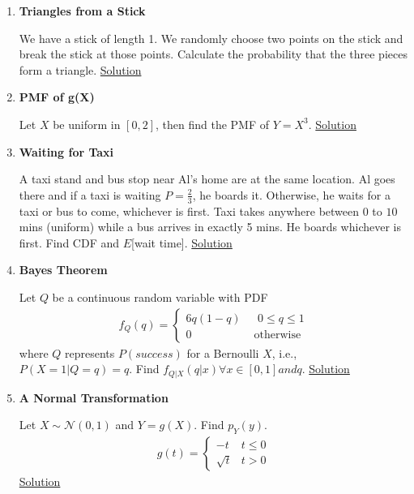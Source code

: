 \documentclass[../probability-notes.tex]{subfiles}
\begin{document}
\begin{enumerate}
    \item \hypertarget{q_trianglestick}{\textbf{Triangles from a Stick}}\newline
    We have a stick of length 1. We randomly choose two points on the stick and break the stick at those points. Calculate the probability that the three pieces form a triangle. \hyperlink{a_trianglestick}{Solution}


    \item \hypertarget{q_pmffn}{\textbf{PMF of g(X)}}\newline
    Let $X$ be uniform in $[0, 2]$, then find the PMF of $Y = X^{3}$. \hyperlink{a_pmffn}{Solution}

    \item \hypertarget{q_waittaxi}{\textbf{Waiting for Taxi}}\newline
    A taxi stand and bus stop near Al's home are at the same location. Al goes there and if a taxi is waiting $P=\frac{2}{3}$, he boards it. Otherwise, he waits for a taxi or bus to come, whichever is first. Taxi takes anywhere between $0$ to $10$ mins (uniform) while a bus arrives in exactly 5 mins. He boards whichever is first. Find CDF and $E$[wait time]. \hyperlink{a_waittaxi}{Solution}
    
    \item \hypertarget{q_bayes}{\textbf{Bayes Theorem}}\newline
    Let $Q$ be a continuous random variable with PDF
    \begin{align*}
        f_{Q}(q) = \begin{cases} 6q(1-q) &\mbox{ $0 \leq q \leq 1$}\\
                                 0 &\mbox{ otherwise} \end{cases}
    \end{align*}
    where $Q$ represents $P(success)$ for a Bernoulli $X$, i.e., $P(X=1|Q=q) = q$. Find $f_{Q|X}(q|x) \forall x \in [0,1] and q$. \hyperlink{a_bayes}{Solution}
    
    \item \hypertarget{q_normaltr}{\textbf{A Normal Transformation}}\newline
    Let $X \sim \mathcal{N}(0,1)$ and $Y = g(X)$. Find $p_{Y}(y)$. 
    \begin{align*}
        g(t) = \begin{cases} -t &\mbox{$t \leq 0$}\\
                            \sqrt{t} &\mbox{$t > 0$} \end{cases}
    \end{align*}
    \hyperlink{a_normaltr}{Solution}


\end{enumerate}
\end{document}
